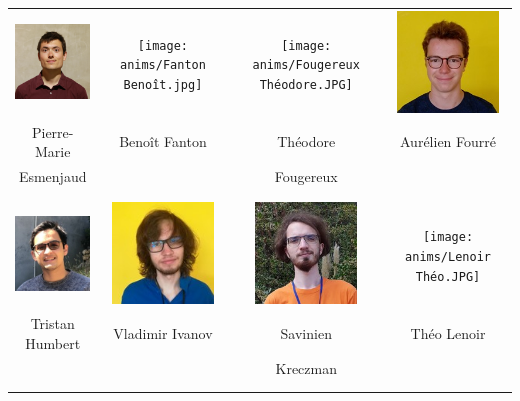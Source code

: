 \begin{center}
\begin{tabular}{cccc}
\includegraphics[angle=0,origin=c, width=27mm]{anims/Esmanjaud Pierre-Marie.JPG} &
\texttt{[image: anims/Fanton Benoît.jpg]} &
\texttt{[image: anims/Fougereux Théodore.JPG]} &
\includegraphics[angle=0,origin=c, width=27mm]{anims/Fourré Aurélien.jpg} \\
Pierre-Marie & Benoît Fanton & Théodore & Aurélien Fourré \\ Esmenjaud & & Fougereux & \\ \\ \\

\includegraphics[angle=0,origin=c, width=27mm]{anims/Humbert Tristan.JPG} &
\includegraphics[angle=0,origin=c, width=27mm]{anims/Ivanov Vladimir.jpg} &
\includegraphics[angle=0,origin=c, width=27mm]{anims/Kreczman Savinien.jpg} &
\texttt{[image: anims/Lenoir Théo.JPG]} \\
Tristan Humbert & Vladimir Ivanov & Savinien & Théo Lenoir \\ & & Kreczman & \\ \\ \\

\end{tabular}
\end{center}
\pagebreak

